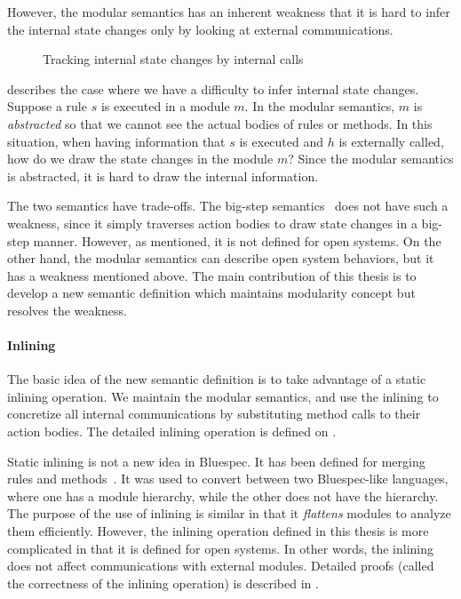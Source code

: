 However, the modular semantics has an inherent weakness that it is
hard to infer the internal state changes only by looking at external
communications.
\begin{figure}[t]
  \caption{Tracking internal state changes by internal calls}
  \label{ex-modular-semantics-disadvantage}
\end{figure}
 describes the case where we
have a difficulty to infer internal state changes. Suppose a rule $s$
is executed in a module $m$. In the modular semantics, $m$ is
\emph{abstracted} so that we cannot see the actual bodies of rules or
methods. In this situation, when having information that $s$ is
executed and $h$ is externally called, how do we draw the state
changes in the module $m$? Since the modular semantics is abstracted,
it is hard to draw the internal information.

The two semantics have trade-offs. The big-step
semantics~\cite{nirav-memocode} does not have such a weakness, since
it simply traverses action bodies to draw state changes in a big-step
manner. However, as mentioned, it is not defined for open systems. On
the other hand, the modular semantics can describe open system
behaviors, but it has a weakness mentioned above. The main
contribution of this thesis is to develop a new semantic definition
which maintains modularity concept but resolves the weakness.

\paragraph{Inlining}

The basic idea of the new semantic definition is to take advantage of
a static inlining operation. We maintain the modular semantics, and
use the inlining to concretize all internal communications by
substituting method calls to their action bodies. The detailed
inlining operation is defined on .

Static inlining is not a new idea in Bluespec. It has been defined for
merging rules and methods~\cite{daniel-thesis}. It was used to convert
between two Bluespec-like languages, where one has a module hierarchy,
while the other does not have the hierarchy. The purpose of the use of
inlining is similar in that it \emph{flattens} modules to analyze them
efficiently. However, the inlining operation defined in this thesis is
more complicated in that it is defined for open systems. In other
words, the inlining does not affect communications with external
modules. Detailed proofs (called the correctness of the inlining
operation) is described in .


